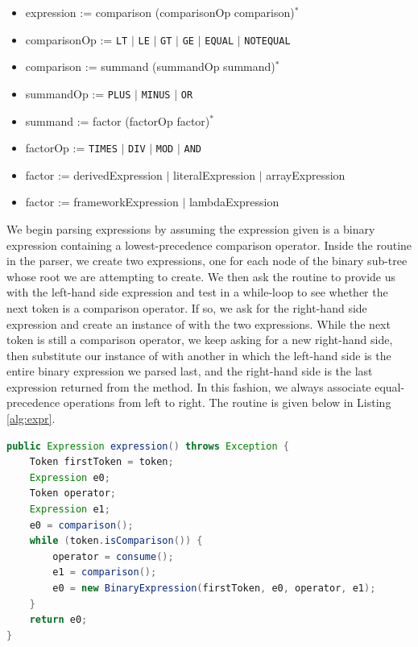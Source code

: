 \begin{itemize}
	\item expression := comparison (comparisonOp comparison)$^*$
	\item comparisonOp := \texttt{LT} $|$ \texttt{LE} $|$ \texttt{GT} $|$ \texttt{GE} $|$ \texttt{EQUAL} $|$ \texttt{NOTEQUAL}
	\item comparison := summand (summandOp summand)$^*$
	\item summandOp := \texttt{PLUS} $|$ \texttt{MINUS} $|$ \texttt{OR}
	\item summand := factor (factorOp factor)$^*$
	\item factorOp := \texttt{TIMES} $|$ \texttt{DIV} $|$ \texttt{MOD} $|$ \texttt{AND}
	\item factor := derivedExpression $|$ literalExpression $|$ arrayExpression
	\item factor := frameworkExpression $|$ lambdaExpression
\end{itemize}

We begin parsing expressions by assuming the expression given is a binary expression containing a lowest-precedence comparison operator. Inside the  routine in the parser, we create two expressions, one for each node of the binary sub-tree whose root we are attempting to create. We then ask the  routine to provide us with the left-hand side expression and test in a while-loop to see whether the next token is a comparison operator. If so, we ask  for the right-hand side expression and create an instance of  with the two expressions. While the next token is still a comparison operator, we keep asking  for a new right-hand side, then substitute our instance of  with another in which the left-hand side is the entire binary expression we parsed last, and the right-hand side is the last expression returned from the  method. In this fashion, we always associate equal-precedence operations from left to right. The  routine is given below in Listing \ref{alg:expr}.

\begin{lstlisting}[language=Java,caption={Parsing Expressions.},label={alg:expr}]
public Expression expression() throws Exception {
	Token firstToken = token;
	Expression e0;
	Token operator;
	Expression e1;
	e0 = comparison();
	while (token.isComparison()) {
		operator = consume();
		e1 = comparison();
		e0 = new BinaryExpression(firstToken, e0, operator, e1);
	}
	return e0;
}
\end{lstlisting}

